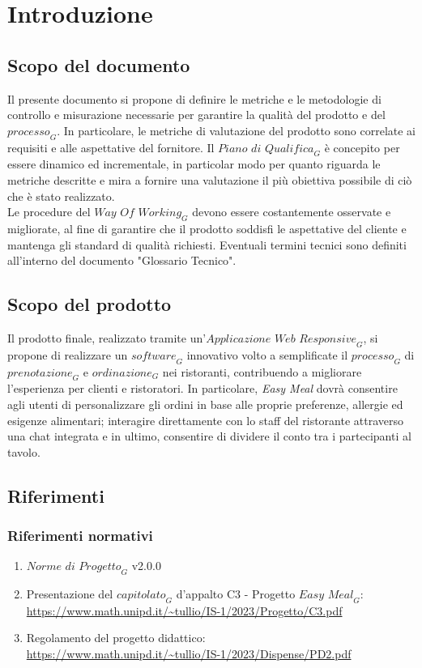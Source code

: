 \section{Introduzione}
\subsection{Scopo del documento}
Il presente documento si propone di definire le metriche e le metodologie di controllo e misurazione necessarie per garantire la qualità del prodotto e del $\textit{processo}_G$. In particolare, le metriche di valutazione del prodotto sono correlate ai requisiti e alle aspettative del fornitore.
Il $\textit{Piano di Qualifica}_G$ è concepito per essere dinamico ed incrementale, in particolar modo per quanto riguarda le metriche descritte e mira a fornire una valutazione il più obiettiva possibile di ciò che è stato realizzato.\\
Le procedure del $\textit{Way Of Working}_G$ devono essere costantemente osservate e migliorate, al fine di garantire che il prodotto soddisfi le aspettative del cliente e mantenga gli standard di qualità richiesti. Eventuali termini tecnici sono definiti all'interno del documento "Glossario Tecnico".
\subsection{Scopo del prodotto}
Il prodotto finale, realizzato tramite un'$\textit{Applicazione Web Responsive}_G$, si propone di realizzare un $\textit{software}_G$ innovativo volto a semplificate il $\textit{processo}_G$ di $\textit{prenotazione}_G$ e $\textit{ordinazione}_G$ nei ristoranti, contribuendo a migliorare l'esperienza per clienti e ristoratori. In particolare, \textit{Easy Meal} dovrà consentire agli utenti di personalizzare gli ordini in base alle proprie preferenze, allergie ed esigenze alimentari; interagire direttamente con lo staff del ristorante attraverso una chat integrata e in ultimo, consentire di dividere il conto tra i partecipanti al tavolo.
\subsection{Riferimenti}
\subsubsection{Riferimenti normativi}
\begin{enumerate}
    \item $\textit{Norme di Progetto}_G$ v2.0.0
    \item Presentazione del $\textit{capitolato}_G$ d'appalto C3 - Progetto $\textit{Easy Meal}_G$: \\ 
    \url{https://www.math.unipd.it/~tullio/IS-1/2023/Progetto/C3.pdf}
    \item Regolamento del progetto didattico: \\ 
    \url{https://www.math.unipd.it/~tullio/IS-1/2023/Dispense/PD2.pdf}
\end{enumerate}
